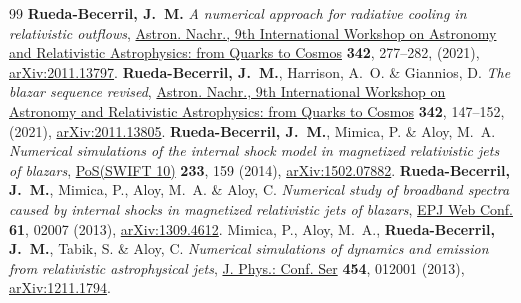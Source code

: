 \renewcommand{\refname}{Proceedings}
\setcounter{num}{0}
\renewcommand{\MyNbOfPub}{5}%
\renewcommand*{\bibliographyitemlabel}{\arabic{enumiv}.}
\begin{thebibliography}{99}
 \textbf{Rueda-Becerril, J.~M.} \emph{A
  numerical approach for radiative cooling in relativistic outflows},
  \href{https://doi.org/10.1002/asna.202113919}{Astron. Nachr., 9th
  International Workshop on Astronomy and Relativistic Astrophysics: from
  Quarks to Cosmos} \textbf{342}, 277--282, (2021),
  \href{https://arxiv.org/abs/2011.13797}{arXiv:2011.13797}.
 \textbf{Rueda-Becerril, J.~M.}, Harrison,
  A.~O. \& Giannios, D. \emph{The blazar sequence revised},
  \href{https://doi.org/10.1002/asna.202113895}{Astron. Nachr., 9th
  International Workshop on Astronomy and Relativistic Astrophysics: from
  Quarks to Cosmos} \textbf{342}, 147--152, (2021),
  \href{https://arxiv.org/abs/2011.13805}{arXiv:2011.13805}.
 \textbf{Rueda-Becerril, J.~M.}, Mimica, P. \&
  Aloy, M.~A. \emph{Numerical simulations of the internal shock model in
  magnetized relativistic jets of blazars},
  \href{https://doi.org/10.22323/1.233.0159}{PoS(SWIFT 10)} \textbf{233}, 159
  (2014), \href{https://arxiv.org/abs/1502.07882}{arXiv:1502.07882}.
 \textbf{Rueda-Becerril, J.~M.}, Mimica, P.,
  Aloy, M.~A. \& Aloy, C. \emph{Numerical study of broadband spectra caused by
  internal shocks in magnetized relativistic jets of blazars},
  \href{https://doi.org/10.1051/epjconf/20136102007}{EPJ Web Conf.}
  \textbf{61}, 02007 (2013),
  \href{https://arxiv.org/abs/1309.4612}{arXiv:1309.4612}.
 Mimica, P., Aloy, M.~A., \textbf{Rueda-Becerril,
  J.~M.}, Tabik, S. \& Aloy, C. \emph{Numerical simulations of dynamics and
  emission from relativistic astrophysical jets},
  \href{https://doi.org/10.1088/1742-6596/454/1/012001}{J. Phys.: Conf. Ser}
  \textbf{454}, 012001 (2013),
  \href{https://arxiv.org/abs/1211.1794}{arXiv:1211.1794}.
\end{thebibliography}




\renewcommand{\bibliographyitemlabel}{\@biblabel{\arabic{enumiv}}}
\renewcommand{\refname}{Articles}

%

